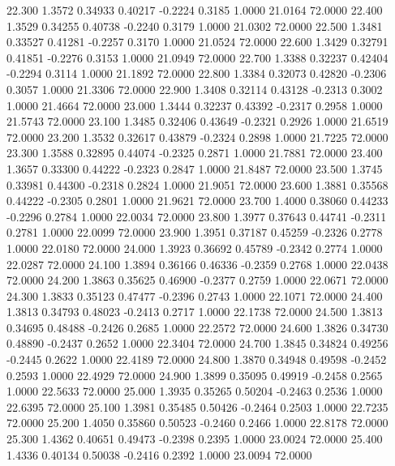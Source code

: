   22.300   1.3572   0.34933   0.40217  -0.2224   0.3185   1.0000  21.0164  72.0000
  22.400   1.3529   0.34255   0.40738  -0.2240   0.3179   1.0000  21.0302  72.0000
  22.500   1.3481   0.33527   0.41281  -0.2257   0.3170   1.0000  21.0524  72.0000
  22.600   1.3429   0.32791   0.41851  -0.2276   0.3153   1.0000  21.0949  72.0000
  22.700   1.3388   0.32237   0.42404  -0.2294   0.3114   1.0000  21.1892  72.0000
  22.800   1.3384   0.32073   0.42820  -0.2306   0.3057   1.0000  21.3306  72.0000
  22.900   1.3408   0.32114   0.43128  -0.2313   0.3002   1.0000  21.4664  72.0000
  23.000   1.3444   0.32237   0.43392  -0.2317   0.2958   1.0000  21.5743  72.0000
  23.100   1.3485   0.32406   0.43649  -0.2321   0.2926   1.0000  21.6519  72.0000
  23.200   1.3532   0.32617   0.43879  -0.2324   0.2898   1.0000  21.7225  72.0000
  23.300   1.3588   0.32895   0.44074  -0.2325   0.2871   1.0000  21.7881  72.0000
  23.400   1.3657   0.33300   0.44222  -0.2323   0.2847   1.0000  21.8487  72.0000
  23.500   1.3745   0.33981   0.44300  -0.2318   0.2824   1.0000  21.9051  72.0000
  23.600   1.3881   0.35568   0.44222  -0.2305   0.2801   1.0000  21.9621  72.0000
  23.700   1.4000   0.38060   0.44233  -0.2296   0.2784   1.0000  22.0034  72.0000
  23.800   1.3977   0.37643   0.44741  -0.2311   0.2781   1.0000  22.0099  72.0000
  23.900   1.3951   0.37187   0.45259  -0.2326   0.2778   1.0000  22.0180  72.0000
  24.000   1.3923   0.36692   0.45789  -0.2342   0.2774   1.0000  22.0287  72.0000
  24.100   1.3894   0.36166   0.46336  -0.2359   0.2768   1.0000  22.0438  72.0000
  24.200   1.3863   0.35625   0.46900  -0.2377   0.2759   1.0000  22.0671  72.0000
  24.300   1.3833   0.35123   0.47477  -0.2396   0.2743   1.0000  22.1071  72.0000
  24.400   1.3813   0.34793   0.48023  -0.2413   0.2717   1.0000  22.1738  72.0000
  24.500   1.3813   0.34695   0.48488  -0.2426   0.2685   1.0000  22.2572  72.0000
  24.600   1.3826   0.34730   0.48890  -0.2437   0.2652   1.0000  22.3404  72.0000
  24.700   1.3845   0.34824   0.49256  -0.2445   0.2622   1.0000  22.4189  72.0000
  24.800   1.3870   0.34948   0.49598  -0.2452   0.2593   1.0000  22.4929  72.0000
  24.900   1.3899   0.35095   0.49919  -0.2458   0.2565   1.0000  22.5633  72.0000
  25.000   1.3935   0.35265   0.50204  -0.2463   0.2536   1.0000  22.6395  72.0000
  25.100   1.3981   0.35485   0.50426  -0.2464   0.2503   1.0000  22.7235  72.0000
  25.200   1.4050   0.35860   0.50523  -0.2460   0.2466   1.0000  22.8178  72.0000
  25.300   1.4362   0.40651   0.49473  -0.2398   0.2395   1.0000  23.0024  72.0000
  25.400   1.4336   0.40134   0.50038  -0.2416   0.2392   1.0000  23.0094  72.0000
